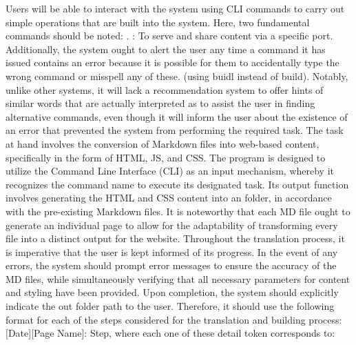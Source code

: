 \markdownRendererDocumentBegin
{}\markdownRendererInterblockSeparator
{}\markdownRendererInterblockSeparator
{}Users will be able to interact with the system using CLI commands to carry out simple operations that are built into the system. Here, two fundamental commands should be noted:\markdownRendererInterblockSeparator
{}\markdownRendererUlBeginTight
\markdownRendererUlItem {}.\markdownRendererUlItemEnd 
\markdownRendererUlItem {}: To serve and share content via a specific port.\markdownRendererUlItemEnd 
\markdownRendererUlEndTight \markdownRendererInterblockSeparator
{}Additionally, the system ought to alert the user any time a command it has issued contains an error because it is possible for them to accidentally type the wrong command or misspell any of these. (using buidl instead of build). Notably, unlike other systems, it will lack a recommendation system to offer hints of similar words that are actually interpreted as to assist the user in finding alternative commands, even though it will inform the user about the existence of an error that prevented the system from performing the required task.\markdownRendererInterblockSeparator
{}\markdownRendererInterblockSeparator
{}The task at hand involves the conversion of Markdown files into web-based content, specifically in the form of HTML, JS, and CSS.\markdownRendererInterblockSeparator
{}The program is designed to utilize the Command Line Interface (CLI) as an input mechanism, whereby it recognizes the command name to execute its designated task. Its output function involves generating the HTML and CSS content into an  folder, in accordance with the pre-existing Markdown files. It is noteworthy that each MD file ought to generate an individual page to allow for the adaptability of transforming every file into a distinct output for the website.\markdownRendererInterblockSeparator
{}Throughout the translation process, it is imperative that the user is kept informed of its progress. In the event of any errors, the system should prompt error messages to ensure the accuracy of the MD files, while simultaneously verifying that all necessary parameters for content and styling have been provided. Upon completion, the system should explicitly indicate the out folder path to the user.\markdownRendererInterblockSeparator
{}Therefore, it should use the following format for each of the steps considered for the translation and building process: [Date][Page Name]: Step, where each one of these detail token corresponds to:\markdownRendererInterblockSeparator

